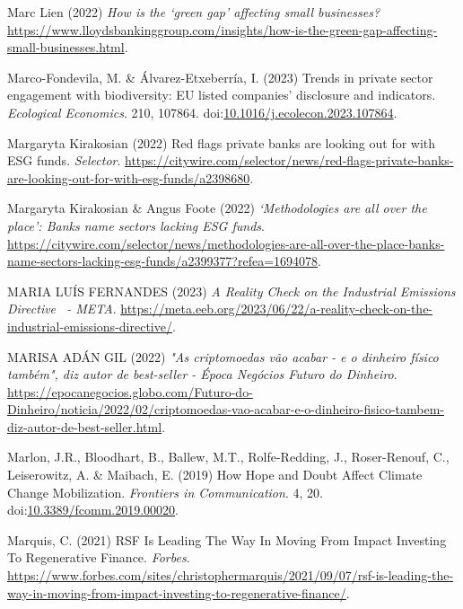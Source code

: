 \documentclass[
  letterpaper,
  DIV=11,
  numbers=noendperiod]{scrartcl}
\newlength{\cslhangindent}
\newenvironment{CSLReferences}[2] %
 {\begin{list}{}{%
  \setlength{\itemindent}{0pt}
  \setlength{\leftmargin}{0pt}
  \setlength{\parsep}{0pt}
  \ifodd #1
   \setlength{\leftmargin}{\cslhangindent}
   \setlength{\itemindent}{-1\cslhangindent}
  \fi
  \setlength{\itemsep}{#2\baselineskip}}}
 {\end{list}}
\begin{document}
\begin{CSLReferences}{0}{1}
Marc Lien (2022) \emph{How is the {`green gap'} affecting small
businesses?}
\url{https://www.lloydsbankinggroup.com/insights/how-is-the-green-gap-affecting-small-businesses.html}.

Marco-Fondevila, M. \& Álvarez-Etxeberría, I. (2023) Trends in private
sector engagement with biodiversity: {EU} listed companies' disclosure
and indicators. \emph{Ecological Economics}. 210, 107864.
doi:\href{https://doi.org/10.1016/j.ecolecon.2023.107864}{10.1016/j.ecolecon.2023.107864}.

Margaryta Kirakosian (2022) Red flags private banks are looking out for
with {ESG} funds. \emph{Selector}.
\url{https://citywire.com/selector/news/red-flags-private-banks-are-looking-out-for-with-esg-funds/a2398680}.

Margaryta Kirakosian \& Angus Foote (2022) \emph{{`{Methodologies} are
all over the place'}: {Banks} name sectors lacking {ESG} funds}.
\url{https://citywire.com/selector/news/methodologies-are-all-over-the-place-banks-name-sectors-lacking-esg-funds/a2399377?refea=1694078}.

MARIA LUÍS FERNANDES (2023) \emph{A {Reality Check} on the {Industrial
Emissions Directive}~ - {META}}.
\url{https://meta.eeb.org/2023/06/22/a-reality-check-on-the-industrial-emissions-directive/}.

MARISA ADÁN GIL (2022) \emph{"{As} criptomoedas v{ã}o acabar - e o
dinheiro f{í}sico tamb{é}m", diz autor de best-seller - {{É}poca
Neg{ó}cios} {\textbar} {Futuro} do {Dinheiro}}.
\url{https://epocanegocios.globo.com/Futuro-do-Dinheiro/noticia/2022/02/criptomoedas-vao-acabar-e-o-dinheiro-fisico-tambem-diz-autor-de-best-seller.html}.

Marlon, J.R., Bloodhart, B., Ballew, M.T., Rolfe-Redding, J.,
Roser-Renouf, C., Leiserowitz, A. \& Maibach, E. (2019) How {Hope} and
{Doubt Affect Climate Change Mobilization}. \emph{Frontiers in
Communication}. 4, 20.
doi:\href{https://doi.org/10.3389/fcomm.2019.00020}{10.3389/fcomm.2019.00020}.

Marquis, C. (2021) {RSF Is Leading The Way In Moving From Impact
Investing To Regenerative Finance}. \emph{Forbes}.
\url{https://www.forbes.com/sites/christophermarquis/2021/09/07/rsf-is-leading-the-way-in-moving-from-impact-investing-to-regenerative-finance/}.


\end{CSLReferences}
\end{document}
